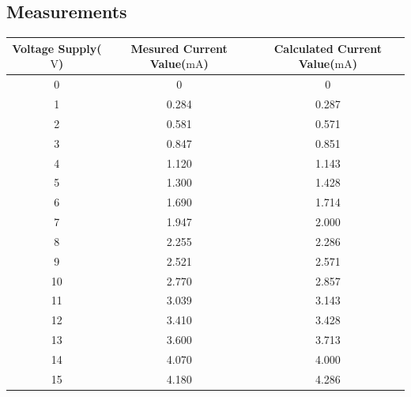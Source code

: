 \documentclass[a4paper]{article}
\begin{document}
\subsection{Measurements}
\begin{center}
    \begin{tabular}{|c|c|c|}
        \hline
        Voltage Supply($\si{\volt}$) & Mesured Current Value($\si{\milli\ampere}$) & Calculated
        Current Value($\si{\milli\ampere}$)\\\hline
        0&0&0\\\hline
        1&0.284&0.287\\\hline
        2&0.581&0.571\\\hline
        3&0.847&0.851\\\hline
        4&1.120&1.143\\\hline
        5&1.300&1.428\\\hline
        6&1.690&1.714\\\hline
        7&1.947&2.000\\\hline
        8&2.255&2.286\\\hline
        9&2.521&2.571\\\hline
        10&2.770&2.857\\\hline
        11&3.039&3.143\\\hline
        12&3.410&3.428\\\hline
        13&3.600&3.713\\\hline
        14&4.070&4.000\\\hline
        15&4.180&4.286\\\hline
    \end{tabular}
     
\end{center}
\end{document}
